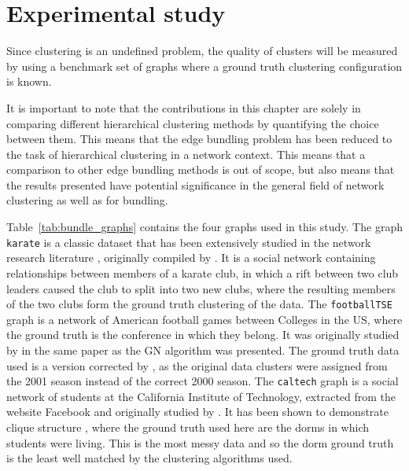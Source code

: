 \section{Experimental study}
\label{sec:clustering_experiment}
Since clustering is an undefined problem, the quality of clusters will be measured by using a benchmark set of graphs where a ground truth clustering configuration is known.

It is important to note that the contributions in this chapter are solely in comparing different hierarchical clustering methods by quantifying the choice between them. This means that the edge bundling problem has been reduced to the task of hierarchical clustering in a network context.
This means that a comparison to other edge bundling methods is out of scope, but also means that the results presented have potential significance in the general field of network clustering as well as for bundling.


Table~\ref{tab:bundle_graphs} contains the four graphs used in this study.
The graph \texttt{karate} is a classic dataset that has been extensively studied in the network research literature \citep{Fortunato2016}, originally compiled by \citet{Zachary1977}. It is a social network containing relationships between members of a karate club, in which a rift between two club leaders caused the club to split into two new clubs, where the resulting members of the two clubs form the ground truth clustering of the data.
The \texttt{footballTSE} graph is a network of American football games between Colleges in the US, where the ground truth is the conference in which they belong. It was originally studied by \citet{Girvan2002} in the same paper as the GN algorithm was presented. The ground truth data used is a version corrected by \citet{Evans2010}, as the original data clusters were assigned from the 2001 season instead of the correct 2000 season. 
The \texttt{caltech} graph is a social network of students at the California Institute of Technology, extracted from the website Facebook and originally studied by \citet{Traud2012}. It has been shown to demonstrate clique structure \citep{Nocaj2015}, where the ground truth used here are the dorms in which students were living. This is the most messy data and so the dorm ground truth is the least well matched by the clustering algorithms used.

